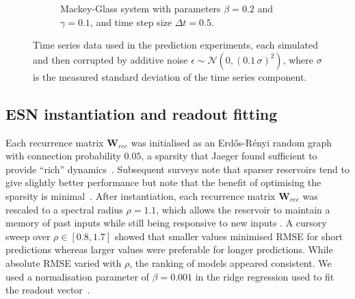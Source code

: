\begin{figure}
\begin{subfigure}[b]{\textwidth}
        \caption{Mackey-Glass system with parameters $\beta = 0.2$ and $\gamma = 0.1$, and time step size $\Delta t = 0.5$.}
    \end{subfigure}
    \caption{Time series data used in the prediction experiments, each simulated and then corrupted by additive noise $\epsilon\sim\mathcal{N}(0,(0.1\,\sigma)^2)$, where $\sigma$ is the measured standard deviation of the time series component.}
    \label{fig:time series_with_noise}
\end{figure}

\subsection{ESN instantiation and readout fitting}

Each recurrence matrix $\mathbf{W}_{rec}$ was initialised as an Erd\H{o}s-R\'enyi random graph with connection probability $0.05$, a sparsity that Jaeger found sufficient to provide ``rich'' dynamics~\cite{jaeger_2001}. Subsequent surveys note that sparser reservoirs tend to give slightly better performance but note that the benefit of optimising the sparsity is minimal~\cite{lukosevicius_2012_practical_guide}.
After instantiation, each recurrence matrix $\mathbf{W}_{rec}$ was rescaled to a spectral radius $\rho = 1.1$, which allows the reservoir to maintain a memory of past inputs while still being responsive to new inputs \cite{jaeger_2001}.
A cursory sweep over $\rho\in[0.8,1.7]$ showed that smaller values minimised RMSE for short predictions whereas larger values were preferable for longer predictions.
While absolute RMSE varied with $\rho$, the ranking of models appeared consistent.
We used a normalisation parameter of $\beta=0.001$ in the ridge regression used to fit the readout vector~\cite{lukosevicius_2012_practical_guide}.

